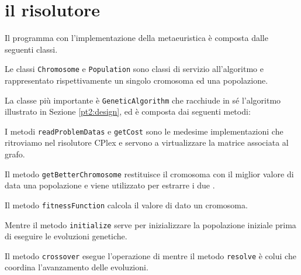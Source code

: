%
%
\section[Il risolutore]{il risolutore}
\label{pt2:solver}
Il programma con l'implementazione della metaeuristica è composta dalle seguenti classi.
\newpage


Le classi \texttt{Chromosome} e \texttt{Population} sono classi di servizio all'algoritmo e rappresentato rispettivamente un singolo cromosoma ed una popolazione.

La classe più importante è \texttt{GeneticAlgorithm} che racchiude in sé l'algoritmo illustrato in Sezione \ref{pt2:design}, ed è composta dai seguenti metodi:


I metodi \texttt{readProblemDatas} e \texttt{getCost} sono le medesime implementazioni che ritroviamo nel risolutore CPlex e servono a virtualizzare la matrice associata al grafo.

Il metodo \texttt{getBetterChromosome} restituisce il cromosoma con il miglior valore di  data una popolazione e viene utilizzato per estrarre i due .

Il metodo \texttt{fitnessFunction} calcola il valore di  dato un cromosoma.

Mentre il metodo \texttt{initialize} serve per inizializzare la popolazione iniziale prima di eseguire le evoluzioni genetiche.

Il metodo \texttt{crossover} esegue l'operazione di  mentre il metodo \texttt{resolve} è colui che coordina l'avanzamento delle evoluzioni.